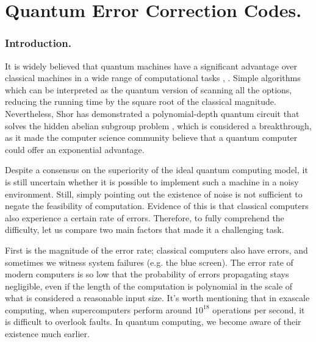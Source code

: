 \documentclass[12pt,a4paper]{article}
\begin{document}


\part{Quantum Error Correction Codes.}
\section{Introduction.}
It is widely believed that quantum machines have a significant advantage over classical machines in a wide range of computational tasks \cite{grover1996fast}, \cite{ahuja1999quantum}. Simple algorithms which can be interpreted as the quantum version of scanning all the options, reducing the running time by the square root of the classical magnitude.
Nevertheless, Shor has demonstrated a polynomial-depth quantum circuit that solves the hidden abelian subgroup problem \cite{Shor_1997}, which is considered a breakthrough, as it made the computer science community believe that a quantum computer could offer an exponential advantage.

Despite a consensus on the superiority of the ideal quantum computing model, it is still uncertain whether it is possible to implement such a machine in a noisy environment.
Still, simply pointing out the existence of noise is not sufficient to negate the feasibility of computation. Evidence of this is that classical computers also experience a certain rate of errors. Therefore, to fully comprehend the difficulty, let us compare two main factors that made it a challenging task.


First is the magnitude of the error rate; classical computers also have errors, and sometimes we witness system failures (e.g. the blue screen). The error rate of modern computers is so low that the probability of errors propagating stays negligible, even if the length of the computation is polynomial in the scale of what is considered a reasonable input size. It's worth mentioning that in exascale computing, when supercomputers perform around $10^{18}$ operations per second, it is difficult to overlook faults. In quantum computing, we become aware of their existence much earlier.
 
\end{document}
